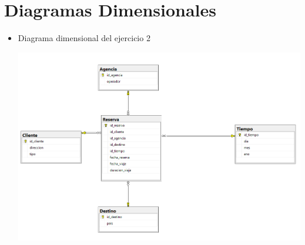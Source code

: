 \section{Diagramas Dimensionales} 

\begin{itemize}
	\item Diagrama dimensional del ejercicio 2
	\\
	\begin{center}
	\includegraphics[width=13cm]{./Imagenes/md_ejer2} 
	\end{center}



\end{itemize} 